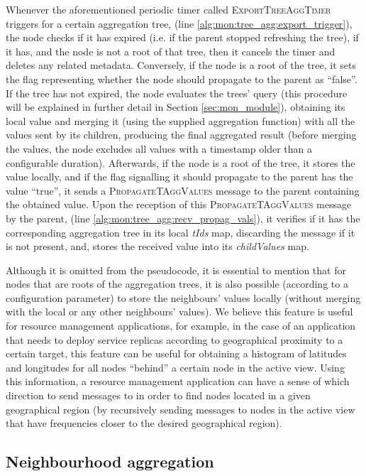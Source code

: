 Whenever the aforementioned periodic timer called \textsc{ExportTreeAggTimer} triggers for a certain aggregation tree, (line \ref{alg:mon:tree_agg:export_trigger}), the node checks if it has expired (i.e. if the parent stopped refreshing the tree), if it has, and the node is not a root of that tree, then it cancels the timer and deletes any related metadata. Conversely, if the node is a root of the tree, it sets the flag representing whether the node should propagate to the parent as ``false''. If the tree has not expired, the node evaluates the trees' query (this procedure will be explained in further detail in Section \ref{sec:mon_module}), obtaining its local value and merging it (using the supplied aggregation function) with all the values sent by its children, producing the final aggregated result (before merging the values, the node excludes all values with a timestamp older than a configurable duration).  Afterwards, if the node is a root of the tree, it stores the value locally, and if the flag signalling it should propagate to the parent has the value ``true'', it sends a \textsc{PropagateTAggValues} message to the parent containing the obtained value. Upon the reception of this \textsc{PropagateTAggValues} message by the parent, (line \ref{alg:mon:tree_agg:recv_propag_vals}), it verifies if it has the corresponding aggregation tree in its local \textit{tIds} map, discarding the message if it is not present, and, stores the received value into its \textit{childValues} map.

Although it is omitted from the pseudocode, it is essential to mention that for nodes that are roots of the aggregation trees, it is also possible (according to a configuration parameter) to store the neighbours' values locally (without merging with the local or any other neighbours' values). We believe this feature is useful for resource management applications, for example, in the case of an application that needs to deploy service replicas according to geographical proximity to a certain target, this feature can be useful for obtaining a histogram of latitudes and longitudes for all nodes ``behind'' a certain node in the active view. Using this information, a resource management application can have a sense of which direction to send messages to in order to find nodes located in a given geographical region (by recursively sending messages to nodes in the active view that have frequencies closer to the desired geographical region).

\subsection{Neighbourhood aggregation} \label{sec:mon_protocol:neigh_agg}

